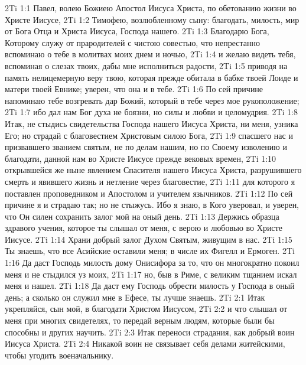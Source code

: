 \vs 2Ti 1:1 Павел, волею Божиею Апостол Иисуса Христа, по обетованию жизни во Христе Иисусе,
\vs 2Ti 1:2 Тимофею, возлюбленному сыну: благодать, милость, мир от Бога Отца и Христа Иисуса, Господа нашего.
\rsbpar\vs 2Ti 1:3 Благодарю Бога, Которому служу от прародителей с чистою совестью, что непрестанно вспоминаю о тебе в молитвах моих днем и ночью,
\vs 2Ti 1:4 и желаю видеть тебя, вспоминая о слезах твоих, дабы мне исполниться радости,
\vs 2Ti 1:5 приводя на память нелицемерную веру твою, которая прежде обитала в бабке твоей Лоиде и матери твоей Евнике; уверен, что она и в тебе.
\vs 2Ti 1:6 По сей причине напоминаю тебе возгревать дар Божий, который в тебе через мое рукоположение;
\vs 2Ti 1:7 ибо дал нам Бог духа не боязни, но силы и любви и целомудрия.
\vs 2Ti 1:8 Итак, не стыдись свидетельства Господа нашего Иисуса Христа, ни меня, узника Его; но страдай с благовестием Христовым силою Бога,
\vs 2Ti 1:9 спасшего нас и призвавшего званием святым, не по делам нашим, но по Своему изволению и благодати, данной нам во Христе Иисусе прежде вековых времен,
\vs 2Ti 1:10 открывшейся же ныне явлением Спасителя нашего Иисуса Христа, разрушившего смерть и явившего жизнь и нетление через благовестие,
\vs 2Ti 1:11 для которого я поставлен проповедником и Апостолом и учителем язычников.
\vs 2Ti 1:12 По сей причине я и страдаю так; но не стыжусь. Ибо я знаю, в Кого уверовал, и уверен, что Он силен сохранить залог мой на оный день.
\vs 2Ti 1:13 Держись образца здравого учения, которое ты слышал от меня, с верою и любовью во Христе Иисусе.
\vs 2Ti 1:14 Храни добрый залог Духом Святым, живущим в нас.
\rsbpar\vs 2Ti 1:15 Ты знаешь, что все Асийские оставили меня; в числе их Фигелл и Ермоген.
\vs 2Ti 1:16 Да даст Господь милость дому Онисифора за то, что он многократно покоил меня и не стыдился уз моих,
\vs 2Ti 1:17 но, быв в Риме, с великим тщанием искал меня и нашел.
\vs 2Ti 1:18 Да даст ему Господь обрести милость у Господа в оный день; а сколько он служил мне в Ефесе, ты лучше знаешь.
\vs 2Ti 2:1 Итак укрепляйся, сын мой, в благодати Христом Иисусом,
\vs 2Ti 2:2 и что слышал от меня при многих свидетелях, то передай верным людям, которые были бы способны и других научить.
\vs 2Ti 2:3 Итак переноси страдания, как добрый воин Иисуса Христа.
\vs 2Ti 2:4 Никакой воин не связывает себя делами житейскими, чтобы угодить военачальнику.
